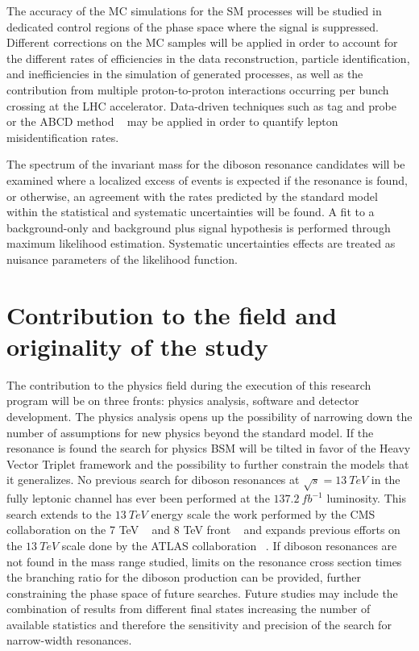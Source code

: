 \documentclass[10pt]{article}
\begin{document}
The accuracy of the MC simulations for the SM processes will be studied in dedicated control regions of the phase space where the signal is suppressed. Different corrections on the MC samples will be applied in order to account for the different rates of efficiencies in the data reconstruction, particle identification, and inefficiencies in the simulation of generated processes, as well as the contribution from multiple proton-to-proton interactions occurring per bunch crossing at the LHC accelerator. Data-driven techniques such as tag and probe ~\cite{tagandprobe} or the ABCD method ~\cite{wz7tev} may be applied in order to quantify lepton misidentification rates. 


The spectrum of the invariant mass for the diboson resonance candidates will be examined where a localized excess of events is expected if the resonance is found, or otherwise, an agreement with the rates predicted by the standard model within the statistical and systematic uncertainties will be found. A fit to a background-only and background plus signal hypothesis is performed through maximum likelihood estimation. Systematic uncertainties effects are treated as nuisance parameters of the likelihood function. 


\section{Contribution to the field and originality of the study}

The contribution to the physics field during the execution of this research program will be on three fronts: physics analysis, software and detector development. 
The physics analysis opens up the possibility of narrowing down the number of assumptions for new physics beyond the standard model. If the resonance is found the search for physics BSM will be tilted in favor of the Heavy Vector Triplet framework and the possibility to further constrain the models that it generalizes. No previous search for diboson resonances at  $\sqrt{s}=13~TeV$ in the fully leptonic channel has ever been performed at the $137.2~fb^{-1}$ luminosity. This search extends to the $13~TeV$ energy scale the work performed by the CMS collaboration on the 7 TeV ~\cite{wprime7TeV} and 8 TeV front ~\cite{wprime8TeV} and expands previous efforts on the $13~TeV$ scale done by the ATLAS collaboration ~\cite{wprimeAtlas}.  If diboson resonances are not found in the mass range studied, limits on the resonance cross section times the branching ratio for the diboson production can be provided, further constraining the phase space of future searches. Future studies may include the combination of results from different final states increasing the number of available statistics and therefore the sensitivity and precision of the search for narrow-width resonances. 
\end{document}
